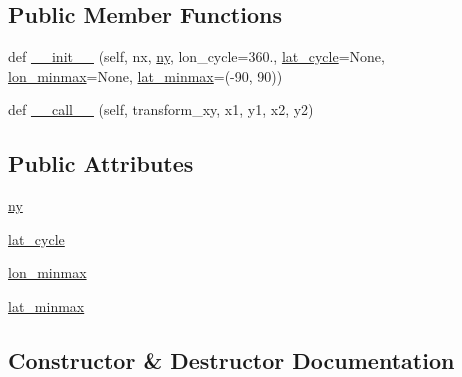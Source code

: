 \subsection*{Public Member Functions}
\begin{DoxyCompactItemize}
\item 
def \hyperlink{classaxisartist_1_1angle__helper_1_1ExtremeFinderCycle_ae27ee1ae7224f650481d2f7fa2e879a3}{\+\_\+\+\_\+init\+\_\+\+\_\+} (self, nx, \hyperlink{classaxisartist_1_1angle__helper_1_1ExtremeFinderCycle_a26592fd68e560cdab11cead304f06c01}{ny}, lon\+\_\+cycle=360., \hyperlink{classaxisartist_1_1angle__helper_1_1ExtremeFinderCycle_a85bd95b92274dc617e5550021b3d84d1}{lat\+\_\+cycle}=None, \hyperlink{classaxisartist_1_1angle__helper_1_1ExtremeFinderCycle_a9007345db124849f201064d5475b156a}{lon\+\_\+minmax}=None, \hyperlink{classaxisartist_1_1angle__helper_1_1ExtremeFinderCycle_a6b90e8baee5b642fb154e1ab499fbfb5}{lat\+\_\+minmax}=(-\/90, 90))
\item 
def \hyperlink{classaxisartist_1_1angle__helper_1_1ExtremeFinderCycle_a3c017e0932e1df8c7e3effec0d4045e6}{\+\_\+\+\_\+call\+\_\+\+\_\+} (self, transform\+\_\+xy, x1, y1, x2, y2)
\end{DoxyCompactItemize}
\subsection*{Public Attributes}
\begin{DoxyCompactItemize}
\item 
\hyperlink{classaxisartist_1_1angle__helper_1_1ExtremeFinderCycle_a26592fd68e560cdab11cead304f06c01}{ny}
\item 
\hyperlink{classaxisartist_1_1angle__helper_1_1ExtremeFinderCycle_a85bd95b92274dc617e5550021b3d84d1}{lat\+\_\+cycle}
\item 
\hyperlink{classaxisartist_1_1angle__helper_1_1ExtremeFinderCycle_a9007345db124849f201064d5475b156a}{lon\+\_\+minmax}
\item 
\hyperlink{classaxisartist_1_1angle__helper_1_1ExtremeFinderCycle_a6b90e8baee5b642fb154e1ab499fbfb5}{lat\+\_\+minmax}
\end{DoxyCompactItemize}


\subsection{Constructor \& Destructor Documentation}
\mbox{\label{classaxisartist_1_1angle__helper_1_1ExtremeFinderCycle_ae27ee1ae7224f650481d2f7fa2e879a3}} 
